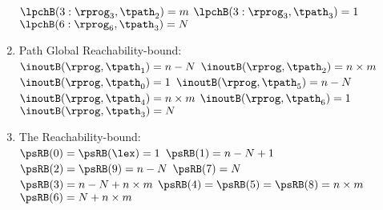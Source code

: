 \begin{enumerate}
{$\lpchB(3: \rprog_3, \tpath_2) = m$ \quad
$\lpchB(3: \rprog_3, \tpath_3) = 1$ \quad 
$\lpchB(6: \rprog_6, \tpath_3) = N$
}
%
%
\item Path Global Reachability-bound:
\\
$\inoutB(\rprog, \tpath_1) = n - N$ \quad
$\inoutB(\rprog, \tpath_2) = n \times m$ \quad
$\inoutB(\rprog, \tpath_0) = 1$ 
\quad
$\inoutB(\rprog, \tpath_5) = n - N$ \quad
$\inoutB(\rprog, \tpath_4) = n \times m$ \quad
$\inoutB(\rprog, \tpath_6) = 1$ 
\quad
$\inoutB(\rprog, \tpath_3) = N$
%
\item The Reachability-bound:
\\
$\psRB(0) = \psRB(\lex) = 1$ \quad
$\psRB(1) = n - N + 1$ \quad
$\psRB(2) = \psRB(9) = n - N$ \quad
$\psRB(7) = N$
\\
$\psRB(3) = n - N + n \times m$ \quad
$\psRB(4) = \psRB(5) = \psRB(8) = n \times m$ \quad
$\psRB(6) = N + n \times m$ 
\end{enumerate}
